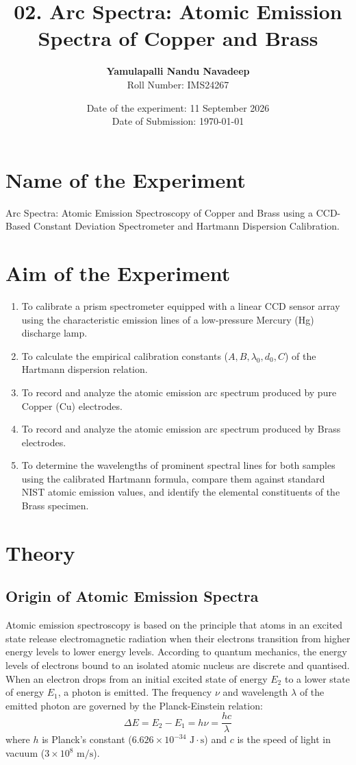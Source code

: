 \documentclass[12pt, a4paper]{article}
\title{\textbf{02. Arc Spectra: Atomic Emission Spectra of Copper and Brass}}
\author{\textbf{Yamulapalli Nandu Navadeep} \\ Roll Number: IMS24267}
\date{Date of the experiment: 11 September 2026 \\ Date of Submission: \today}
\begin{document}
\maketitle

\section{Name of the Experiment}
Arc Spectra: Atomic Emission Spectroscopy of Copper and Brass using a CCD-Based Constant Deviation Spectrometer and Hartmann Dispersion Calibration.

\section{Aim of the Experiment}
\begin{enumerate}
    \item To calibrate a prism spectrometer equipped with a linear CCD sensor array using the characteristic emission lines of a low-pressure Mercury (Hg) discharge lamp.
    \item To calculate the empirical calibration constants ($A, B, \lambda_0, d_0, C$) of the Hartmann dispersion relation.
    \item To record and analyze the atomic emission arc spectrum produced by pure Copper (Cu) electrodes.
    \item To record and analyze the atomic emission arc spectrum produced by Brass electrodes.
    \item To determine the wavelengths of prominent spectral lines for both samples using the calibrated Hartmann formula, compare them against standard NIST atomic emission values, and identify the elemental constituents of the Brass specimen.
\end{enumerate}

\section{Theory}

\subsection{Origin of Atomic Emission Spectra}
Atomic emission spectroscopy is based on the principle that atoms in an excited state release electromagnetic radiation when their electrons transition from higher energy levels to lower energy levels. According to quantum mechanics, the energy levels of electrons bound to an isolated atomic nucleus are discrete and quantised. When an electron drops from an initial excited state of energy $E_2$ to a lower state of energy $E_1$, a photon is emitted. The frequency $\nu$ and wavelength $\lambda$ of the emitted photon are governed by the Planck-Einstein relation:
\begin{equation}
    \Delta E = E_2 - E_1 = h \nu = \frac{h c}{\lambda}
\end{equation}
where $h$ is Planck's constant ($6.626 \times 10^{-34}\text{ J}\cdot\text{s}$) and $c$ is the speed of light in vacuum ($3 \times 10^8\text{ m/s}$).
\end{document}
